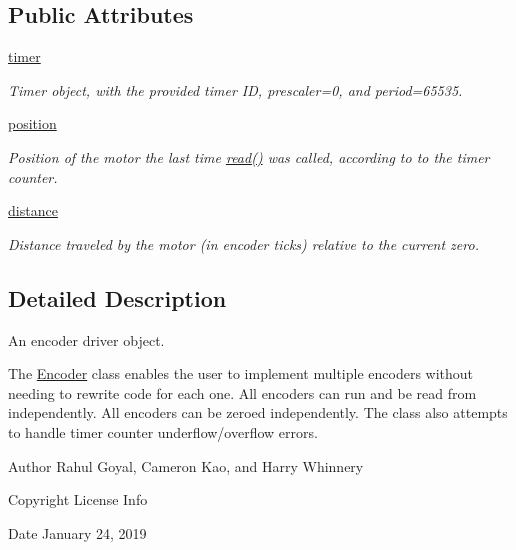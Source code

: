 \subsection*{Public Attributes}
\begin{DoxyCompactItemize}
\item 
\mbox{\hyperlink{classencoder_1_1_encoder_a8e9c3e1317abc4f6fbe95468c69223d1}{timer}}
\begin{DoxyCompactList}\small\item\em Timer object, with the provided timer ID, prescaler=0, and period=65535. \end{DoxyCompactList}\item 
\mbox{\hyperlink{classencoder_1_1_encoder_a9c15eb087b5869c188cf94e53ea3b4f5}{position}}
\begin{DoxyCompactList}\small\item\em Position of the motor the last time \mbox{\hyperlink{classencoder_1_1_encoder_aa1c1535160682500f5214f45d8197027}{read()}} was called, according to to the timer counter. \end{DoxyCompactList}\item 
\mbox{\hyperlink{classencoder_1_1_encoder_ac16be7b70ef28d19b75108d422f82e28}{distance}}
\begin{DoxyCompactList}\small\item\em Distance traveled by the motor (in encoder ticks) relative to the current zero. \end{DoxyCompactList}\end{DoxyCompactItemize}


\subsection{Detailed Description}
An encoder driver object. 

The \mbox{\hyperlink{classencoder_1_1_encoder}{Encoder}} class enables the user to implement multiple encoders without needing to rewrite code for each one. All encoders can run and be read from independently. All encoders can be zeroed independently. The class also attempts to handle timer counter underflow/overflow errors. \begin{DoxyAuthor}{Author}
Rahul Goyal, Cameron Kao, and Harry Whinnery 
\end{DoxyAuthor}
\begin{DoxyCopyright}{Copyright}
License Info 
\end{DoxyCopyright}
\begin{DoxyDate}{Date}
January 24, 2019 
\end{DoxyDate}


